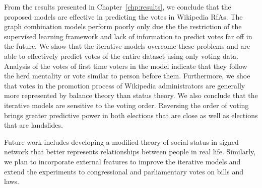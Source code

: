 From the results presented in Chapter~\ref{chp:results}, we conclude that the proposed models are effective in predicting the votes in Wikipedia RfAs.
The graph combination models perform poorly only due the the restriction of the supervised learning framework and lack of information to predict votes far off in the future.
We show that the iterative models overcome these problems and are able to effectively predict votes of the entire dataset using only voting data.
Analysis of the votes of first time voters in the model indicate that they follow the herd mentality or vote similar to person before them.
Furthermore, we shoe that votes in the promotion process of Wikipedia administrators are generally more represented by balance theory than status theory.
We also conclude that the iterative models are sensitive to the voting order.
Reversing the order of voting brings greater predictive power in both elections that are close as well as elections that are landslides.

Future work includes developing a modified theory of social status in signed network that better represents relationships between people in real life. Similarly, we plan to incorporate external features to improve the iterative models and extend the experiments to congressional and parliamentary votes on bills and laws. 


